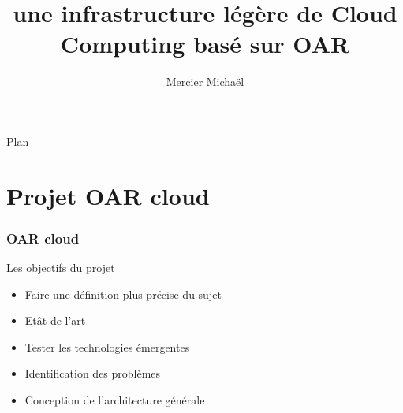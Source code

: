 \documentclass{beamer}
\title[OAR cloud]{une infrastructure légère de Cloud Computing basé sur OAR}
\author{Mercier Michaël}
\date{}
\begin{document}
	\begin{frame}
		\titlepage
	\end{frame}
	
	
	\begin{frame} 
		\begin{center}{\Large Plan }\end{center}
		\tableofcontents[hidesubsections]
	\end{frame}
	
	
  \section{Projet OAR cloud}
		\begin{frame}
			\frametitle{OAR cloud}
			Les objectifs du projet
			\begin{itemize}
			  \item Faire une définition plus précise du sujet
			  \item Etât de l'art
			  \item Tester les technologies émergentes
			  \item Identification des problèmes
			  \item Conception de l'architecture générale
			\end{itemize}
			
		\end{frame}
			
			
% 				
% 		
% 				
% 			
% 				
			
\end{document}
